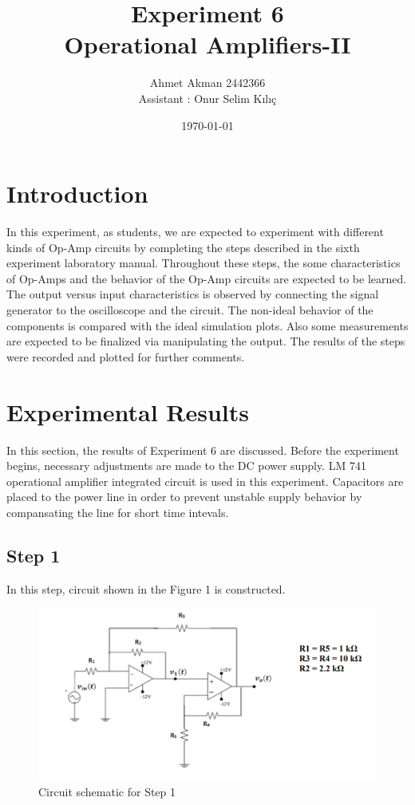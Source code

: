 \documentclass[letterpaper,12pt]{article}
\begin{document}
\title{Experiment 6 \protect\\Operational Amplifiers-II}
\author{Ahmet Akman 2442366 \protect\\ Assistant : Onur Selim Kılıç}
\date{\today}
\maketitle
\newpage
\tableofcontents
\newpage

\section{Introduction} 
In this experiment, as students, we are expected to experiment with different kinds of Op-Amp circuits by completing the steps described in the sixth experiment laboratory manual. Throughout these steps, the some characteristics of Op-Amps and the behavior of the Op-Amp circuits are expected to be learned. The output versus input characteristics is observed by connecting the signal generator to the oscilloscope and the circuit. The non-ideal behavior of the components is compared with the ideal simulation plots. Also some measurements are expected to be finalized via manipulating the output. The results of the steps were recorded and plotted for further comments.
\section{Experimental Results}
In this section, the results of Experiment 6 are discussed. Before the experiment begins, necessary adjustments are made to the DC power supply. LM 741 operational amplifier integrated circuit is used in this experiment. Capacitors are placed to the power line in order to prevent unstable supply behavior by compansating the line for short time intevals.
\subsection{Step 1}
In this step, circuit shown in the Figure 1  is constructed. 
\begin{figure}[H]
	\centering
   \includegraphics[width=1\textwidth]{circuit_1.png}
   \caption{Circuit schematic for Step 1}
\end{figure}
\end{document}
